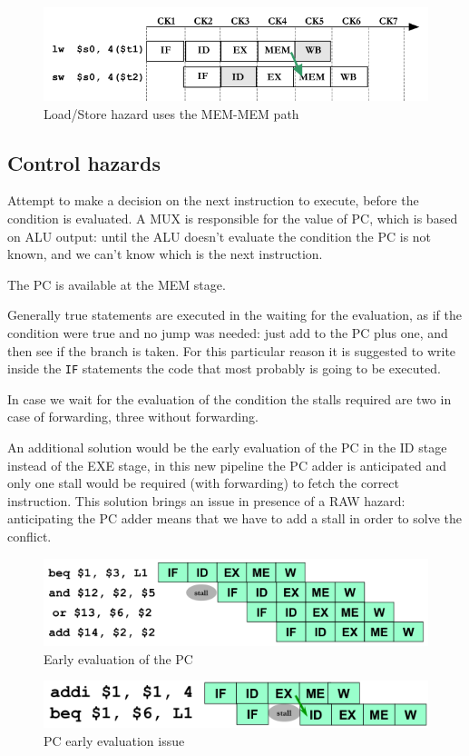\begin{figure}[h]
    \centering
    \includegraphics[scale=0.4]{images/load-store-hazard}
    \caption{Load/Store hazard uses the MEM-MEM path}
    \label{fig:load-store-hazard}
\end{figure}


\subsection{Control hazards}\label{subsec:control-hazards}
Attempt to make a decision on the next instruction to execute, before the condition is evaluated.
A MUX is responsible for the value of PC, which is based on ALU output: until the ALU doesn't evaluate the
condition the PC is not known, and we can't know which is the next instruction.

The PC is available at the MEM stage.

Generally true statements are executed in the waiting for the evaluation, as if the condition
were true and no jump was needed: just add to the PC plus one, and then see if the branch is taken.
For this particular reason it is suggested to write inside the \verb|IF| statements the code that most probably is
going to be executed.

In case we wait for the evaluation of the condition the stalls required are two in case of forwarding, three without forwarding.

An additional solution would be the early evaluation of the PC in the ID stage instead of the EXE stage, in this new
pipeline the PC adder is anticipated and only one stall would be required (with forwarding) to fetch the correct instruction.
This solution brings an issue in presence of a RAW hazard: anticipating the PC adder means that we have to add a stall
in order to solve the conflict.

\begin{figure}[h]
    \centering
    \includegraphics[scale = 0.4]{images/pc-early-evaluation}
    \caption{Early evaluation of the PC}
    \label{fig:pc-early-evaluation}
\end{figure}

\begin{figure}[h]
    \centering
    \includegraphics[scale = 0.4]{images/pc-early-evalutation-issue}
    \caption{PC early evaluation issue}
    \label{fig:pc-early-evaluation-issue}
\end{figure}